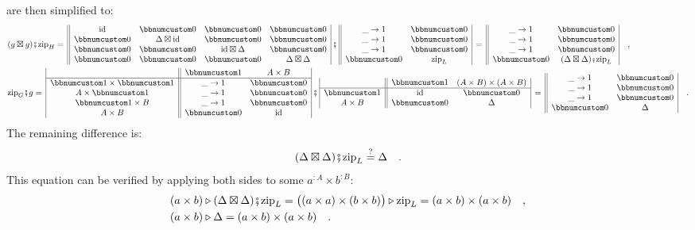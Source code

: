 are then simplified to:
\begin{align*}
 & (g\boxtimes g)\bef\text{zip}_{H}=\,\begin{array}{||cccc|}
\text{id} & \bbnum 0 & \bbnum 0 & \bbnum 0\\
\bbnum 0 & \Delta\boxtimes\text{id} & \bbnum 0 & \bbnum 0\\
\bbnum 0 & \bbnum 0 & \text{id}\boxtimes\Delta & \bbnum 0\\
\bbnum 0 & \bbnum 0 & \bbnum 0 & \Delta\boxtimes\Delta
\end{array}\,\bef\,\begin{array}{||cc|}
\_\rightarrow1 & \bbnum 0\\
\_\rightarrow1 & \bbnum 0\\
\_\rightarrow1 & \bbnum 0\\
\bbnum 0 & \text{zip}_{L}
\end{array}\,=\,\begin{array}{||cc|}
\_\rightarrow1 & \bbnum 0\\
\_\rightarrow1 & \bbnum 0\\
\_\rightarrow1 & \bbnum 0\\
\bbnum 0 & (\Delta\boxtimes\Delta)\bef\text{zip}_{L}
\end{array}\quad,\\
 & \text{zip}_{G}\bef g=\,\begin{array}{|c||cc|}
 & \bbnum 1 & A\times B\\
\hline \bbnum 1\times\bbnum 1 & \_\rightarrow1 & \bbnum 0\\
A\times\bbnum 1 & \_\rightarrow1 & \bbnum 0\\
\bbnum 1\times B & \_\rightarrow1 & \bbnum 0\\
A\times B & \bbnum 0 & \text{id}
\end{array}\,\bef\,\begin{array}{|c||cc|}
 & \bbnum 1 & (A\times B)\times(A\times B)\\
\hline \bbnum 1 & \text{id} & \bbnum 0\\
A\times B & \bbnum 0 & \Delta
\end{array}\,=\,\begin{array}{||cc|}
\_\rightarrow1 & \bbnum 0\\
\_\rightarrow1 & \bbnum 0\\
\_\rightarrow1 & \bbnum 0\\
\bbnum 0 & \Delta
\end{array}\quad.
\end{align*}
The remaining difference is:
\[
(\Delta\boxtimes\Delta)\bef\text{zip}_{L}\overset{?}{=}\Delta\quad.
\]
This equation can be verified by applying both sides to some $a^{:A}\times b^{:B}$:
\begin{align*}
 & (a\times b)\triangleright(\Delta\boxtimes\Delta)\bef\text{zip}_{L}=\big((a\times a)\times(b\times b)\big)\triangleright\text{zip}_{L}=(a\times b)\times(a\times b)\quad,\\
 & (a\times b)\triangleright\Delta=(a\times b)\times(a\times b)\quad.
\end{align*}

